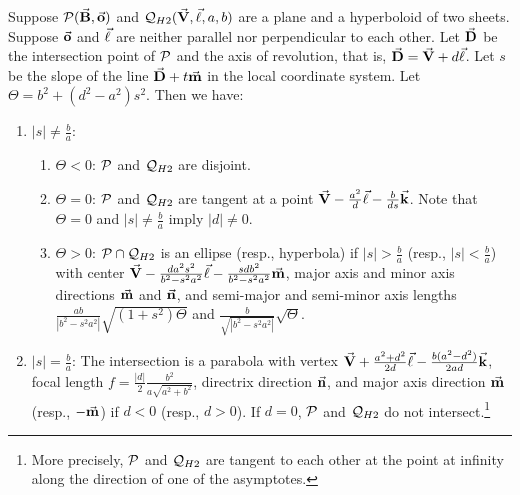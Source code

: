 \begin{theorem}
\label{thm:hy2-general}
     Suppose ${\cal P}(\vec{\bf B},\vec{\bf o})$ and
${\cal Q}_{H2}(\vec{\bf V},\vec{\bf \ell},a,b)$ are a plane and a hyperboloid of
two sheets. Suppose $\vec{\bf o}$ and $\vec{\bf \ell}$ are neither parallel nor 
perpendicular to each other.  Let $\vec{\bf D}$ be the intersection point of 
${\cal P}$ and the axis of revolution, that is, 
$\vec{\bf D}=\vec{\bf V}+d\vec{\bf \ell}$.
Let $s$ be the slope of the line $\vec{\bf D}+t\vec{\bf m}$ in the local coordinate
system.  Let $\Theta=b^2+(d^2-a^2)s^2$.  Then we have:
\begin{enumerate}
     \item $|s|\neq\frac{b}{a}$:
     \begin{enumerate}
          \item $\Theta<0$: ${\cal P}$ and ${\cal Q}_{H2}$ are disjoint.
          \item $\Theta=0$: ${\cal P}$ and ${\cal Q}_{H2}$ are tangent
               at a point $\vec{\bf V}-\frac{a^2}{d}\vec{\bf \ell}-\frac{b}{ds}
               \vec{\bf k}$.  Note that $\Theta=0$ and $|s|\neq\frac{b}{a}$
               imply $|d|\neq 0$.
          \item $\Theta>0$: ${\cal P}\cap{\cal Q}_{H2}$ is an ellipse
               (resp., hyperbola) if $|s|>\frac{b}{a}$ (resp., 
               $|s|<\frac{b}{a}$) with center 
               $\vec{\bf V}-\frac{da^2s^2}{b^2-s^2a^2}\vec{\bf \ell}
                    -\frac{sdb^2}{b^2-s^2a^2}\vec{\bf m}$, major axis and minor
               axis directions $\vec{\bf m}$ and $\vec{\bf n}$, and semi-major
               and semi-minor axis lengths
               $\frac{ab}{|b^2-s^2a^2|}\sqrt{(1+s^2)\Theta}$ and
               $\frac{b}{\sqrt{|b^2-s^2a^2|}}\sqrt{\Theta}$.
     \end{enumerate}
     \item $|s|=\frac{b}{a}$:  The intersection is a parabola with vertex
          $\vec{\bf V}+\frac{a^2+d^2}{2d}\vec{\bf \ell}-
               \frac{b(a^2-d^2)}{2ad}\vec{\bf k}$, focal length
          $f=\frac{|d|}{2}\frac{b^2}{a\sqrt{a^2+b^2}}$, directrix direction
          $\vec{\bf n}$, and major axis direction $\vec{\bf m}$ (resp., 
          $-\vec{\bf m}$) if $d<0$ (resp., $d>0$).  If $d=0$, ${\cal P}$ and
          ${\cal Q}_{H2}$ do not intersect.\footnote{More precisely,
          ${\cal P}$ and ${\cal Q}_{H2}$ are tangent to each other at the point
          at infinity along the direction of one of the asymptotes.}
\end{enumerate}
\end{theorem}
